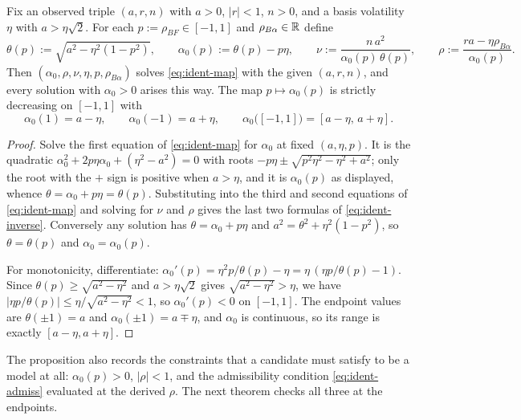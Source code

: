 \documentclass[../../../main.tex]{subfiles}
\begin{document}
\begin{proposition}\label{prop:ident-inverse}
Fix an observed triple $(a,r,n)$ with $a>0$, $|r|<1$, $n>0$, and a basis volatility $\eta$ with $a>\eta\sqrt2$. For each $p:=\rho_{BF}\in[-1,1]$ and $\rho_{B\alpha}\in\mathbb{R}$ define
\begin{equation}\label{eq:ident-inverse}
\theta(p):=\sqrt{a^2-\eta^2(1-p^2)},\qquad
\alpha_0(p):=\theta(p)-p\eta,\qquad
\nu:=\frac{n\,a^2}{\alpha_0(p)\,\theta(p)},\qquad
\rho:=\frac{ra-\eta\rho_{B\alpha}}{\alpha_0(p)} .
\end{equation}
Then $(\alpha_0,\rho,\nu,\eta,p,\rho_{B\alpha})$ solves \eqref{eq:ident-map} with the given $(a,r,n)$, and every solution with $\alpha_0>0$ arises this way. The map $p\mapsto\alpha_0(p)$ is strictly decreasing on $[-1,1]$ with
\begin{equation}\label{eq:ident-alpharange}
\alpha_0(1)=a-\eta,\qquad \alpha_0(-1)=a+\eta,\qquad \alpha_0\big([-1,1]\big)=[a-\eta,\,a+\eta].
\end{equation}
\end{proposition}

\begin{proof}
Solve the first equation of \eqref{eq:ident-map} for $\alpha_0$ at fixed $(a,\eta,p)$. It is the quadratic $\alpha_0^2+2p\eta\alpha_0+(\eta^2-a^2)=0$ with roots $-p\eta\pm\sqrt{p^2\eta^2-\eta^2+a^2}$; only the root with the $+$ sign is positive when $a>\eta$, and it is $\alpha_0(p)$ as displayed, whence $\theta=\alpha_0+p\eta=\theta(p)$. Substituting into the third and second equations of \eqref{eq:ident-map} and solving for $\nu$ and $\rho$ gives the last two formulas of \eqref{eq:ident-inverse}. Conversely any solution has $\theta=\alpha_0+p\eta$ and $a^2=\theta^2+\eta^2(1-p^2)$, so $\theta=\theta(p)$ and $\alpha_0=\alpha_0(p)$.

For monotonicity, differentiate: $\alpha_0'(p)=\eta^2p/\theta(p)-\eta=\eta\,(\eta p/\theta(p)-1)$. Since $\theta(p)\ge\sqrt{a^2-\eta^2}$ and $a>\eta\sqrt2$ gives $\sqrt{a^2-\eta^2}>\eta$, we have $|\eta p/\theta(p)|\le\eta/\sqrt{a^2-\eta^2}<1$, so $\alpha_0'(p)<0$ on $[-1,1]$. The endpoint values are $\theta(\pm1)=a$ and $\alpha_0(\pm1)=a\mp\eta$, and $\alpha_0$ is continuous, so its range is exactly $[a-\eta,a+\eta]$.
\end{proof}

The proposition also records the constraints that a candidate must satisfy to be a model at all: $\alpha_0(p)>0$, $|\rho|<1$, and the admissibility condition \eqref{eq:ident-admiss} evaluated at the derived $\rho$. The next theorem checks all three at the endpoints.
\end{document}
